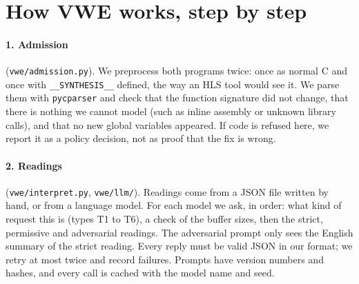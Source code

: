 \documentclass[10pt,a4paper]{article}
\newcommand{\Pz}{P_0}\newcommand{\Po}{P_1}
\begin{document}
\section{How VWE works, step by step}
\begin{center}
\end{center}

\paragraph{1. Admission} (\texttt{vwe/admission.py}). We preprocess both programs twice: once as
normal C and once with \texttt{\_\_SYNTHESIS\_\_} defined, the way an HLS tool would see it. We
parse them with \texttt{pycparser} and check that the function signature did not change, that
there is nothing we cannot model (such as inline assembly or unknown library calls), and that no
new global variables appeared. If code is refused here, we report it as a policy decision, not as
proof that the fix is wrong.

\paragraph{2. Readings} (\texttt{vwe/interpret.py}, \texttt{vwe/llm/}). Readings come from a
JSON file written by hand, or from a language model. For each model we ask, in order: what kind of
request this is (types T1 to T6), a check of the buffer sizes, then the strict, permissive and
adversarial readings. The adversarial prompt only sees the English summary of the strict reading.
Every reply must be valid JSON in our format; we retry at most twice and record failures. Prompts
have version numbers and hashes, and every call is cached with the model name and seed.
\end{document}
